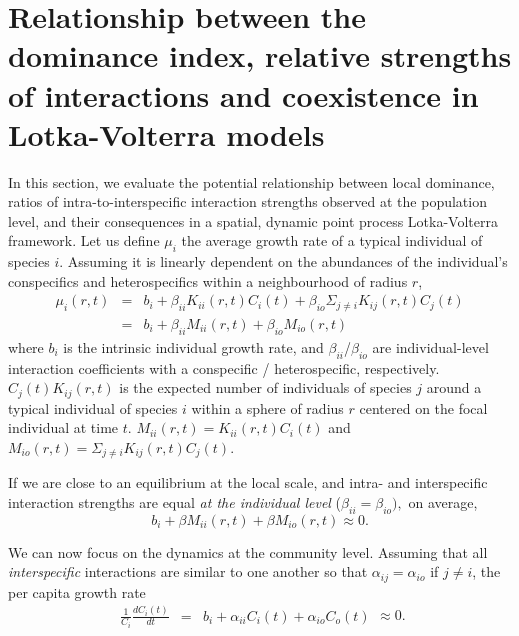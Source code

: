 \documentclass[english]{article}
\begin{document}
\section{Relationship between the dominance index, relative strengths of interactions
and coexistence in Lotka-Volterra models}

In this section, we evaluate the potential relationship between local
dominance, ratios of intra-to-interspecific interaction strengths
observed at the population level, and their consequences in a spatial,
dynamic point process Lotka-Volterra framework. Let us define $\mu_{i}$
the average growth rate of a typical individual of species $i$. Assuming
it is linearly dependent on the abundances of the individual's conspecifics
and heterospecifics within a neighbourhood of radius $r$,
\begin{equation}
\begin{array}{ccc}
\mu_{i}(r,t) & = & b_{i}+\beta_{ii}K_{ii}(r,t)C_{i}(t)+\beta_{io}\Sigma_{j\neq i}K_{ij}(r,t)C_{j}(t)\\
 & = & b_{i}+\beta_{ii}M_{ii}(r,t)+\beta_{io}M_{io}(r,t)
\end{array}\label{eq:lv_individual}
\end{equation}
where $b_{i}$ is the intrinsic individual growth rate, and $\beta_{ii}$/$\beta_{io}$
are individual-level interaction coefficients with a conspecific /
heterospecific, respectively. $C_{j}(t)K_{ij}(r,t)$ is the expected
number of individuals of species $j$ around a typical individual
of species $i$ within a sphere of radius $r$ centered on the focal
individual at time $t$. $M_{ii}(r,t)=K_{ii}(r,t)C_{i}(t)$ and $M_{io}(r,t)=\Sigma_{j\neq i}K_{ij}(r,t)C_{j}(t)$.

If we are close to an equilibrium at the local scale, and intra- and
interspecific interaction strengths are equal \textit{at the individual
level} ($\beta_{ii}=\beta_{io}),$ on average,
\begin{equation}
b_{i}+\beta M_{ii}(r,t)+\beta M_{io}(r,t)\approx0.\label{eq:lv_individual_equilibrium}
\end{equation}

\medskip{}

We can now focus on the dynamics at the community level. Assuming
that all \emph{interspecific} interactions are similar to one another
so that $\alpha_{ij}=\alpha_{io}$ if $j\neq i$, the per capita growth
rate
\begin{equation}
\begin{array}{ccc}
\frac{1}{C_{i}}\frac{dC_{i}(t)}{dt} & = & b_{i}+\alpha_{ii}C_{i}(t)+\alpha_{io}C_{o}(t)\end{array}\approx0.\label{eq:lv_population}
\end{equation}
\end{document}
